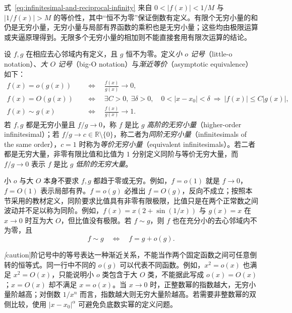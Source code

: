 式~\eqref{eq:infinitesimal-and-reciprocal-infinity} 来自 $0<|f(x)|<1/M$ 与 $|1/f(x)|>M$ 的等价性，其中“恒不为零”保证倒数有定义。有限个无穷小量的和仍是无穷小量，无穷小量与局部有界函数的乘积也是无穷小量；这些均由极限运算或夹逼原理得到。无限多个无穷小量的相加则不能直接套用有限次运算的结论。

\begin{definition}
\label{def:little-o-big-o-and-asymptotic-equivalence}
设 $f,g$ 在相应去心邻域内有定义，且 $g$ 恒不为零。定义\emph{小 $o$ 记号}（little-o notation）、\emph{大 $O$ 记号}（big-O notation）与\emph{渐近等价}（asymptotic equivalence）如下：
\begin{equation}
    \begin{aligned}
        f(x)=o(g(x))
        &\quad\Longleftrightarrow\quad \frac{f(x)}{g(x)}\to0,\\
        f(x)=O(g(x))
        &\quad\Longleftrightarrow\quad
        \exists C>0,\ \exists\delta>0,\quad
        0<|x-x_0|<\delta\ \Longrightarrow\ |f(x)|\leq C|g(x)|,\\
        f(x)\sim g(x)
        &\quad\Longleftrightarrow\quad \frac{f(x)}{g(x)}\to1.
    \end{aligned}
    \label{eq:asymptotic-comparison-notations}
\end{equation}
若 $f,g$ 都是无穷小量且 $f/g\to0$，称 $f$ 是比 $g$ \emph{高阶的无穷小量}（higher-order infinitesimal）；若 $f/g\to c\in\mathbb{R}\setminus\{0\}$，称二者为\emph{同阶无穷小量}（infinitesimals of the same order），$c=1$ 时称为\emph{等价无穷小量}（equivalent infinitesimals）。若二者都是无穷大量，非零有限比值和比值为 $1$ 分别定义同阶与等价无穷大量，而 $f/g\to0$ 表示 $f$ 是比 $g$ \emph{低阶的无穷大量}。
\end{definition}

小 $o$ 与大 $O$ 本身不要求 $f,g$ 都趋于零或无穷。例如，$f=o(1)$ 就是 $f\to0$，$f=O(1)$ 表示局部有界。$f=o(g)$ 必推出 $f=O(g)$，反向不成立；按照本节采用的教材定义，同阶要求比值具有非零有限极限，比值只是在两个正常数之间波动并不足以称为同阶。例如，$f(x)=x(2+\sin(1/x))$ 与 $g(x)=x$ 在 $x\to0$ 时互为大 $O$，但比值没有极限。若 $f\sim g$，则 $f$ 也在充分小的去心邻域内不为零，且
\begin{equation}
    f\sim g
    \quad\Longleftrightarrow\quad
    f=g+o(g).
    \label{eq:asymptotic-equivalence-remainder}
\end{equation}

\emph[caution]{阶记号中的等号表达一种渐近关系，不能当作两个固定函数之间可任意倒转的恒等式。}同一行中不同的 $o(g)$ 可以代表不同函数。例如，$x^2=o(x)$ 也满足 $x^2=O(x)$，只能说明小 $o$ 类包含于大 $O$ 类，不能据此写成 $o(x)=O(x)$；$x=O(x)$ 却不满足 $x=o(x)$。当 $x\to0$ 时，正整数幂的指数越大，无穷小量阶越高；对倒数 $1/x^n$ 而言，指数越大则无穷大量阶越高。若需要非整数幂的双侧比较，使用 $|x-x_0|^\alpha$ 可避免负底数实幂的定义问题。

